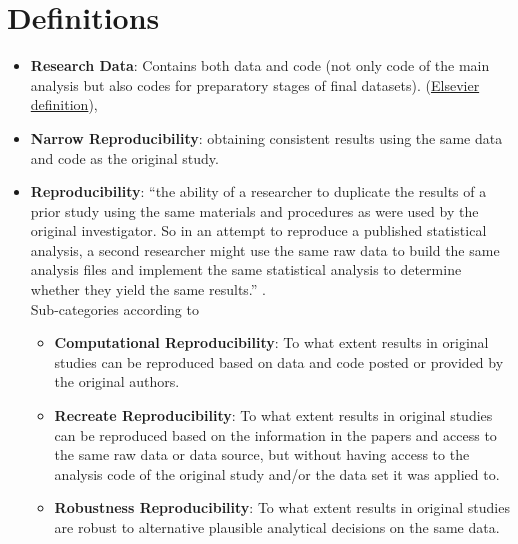 \documentclass[11pt]{article}
\begin{document}
\newpage
\section*{Definitions}
\begin{itemize}
	\item \textbf{Research Data}: Contains both data and code (not only code of the main analysis but also codes for preparatory stages of final datasets).
	(\href{https://www.elsevier.com/authors/tools-and-resources/research-data}{Elsevier definition}),
	\item \textbf{Narrow Reproducibility}: obtaining consistent results using the same data and code
	as the original study. \cite{whited2023Costs}
	
	\item \textbf{Reproducibility}: “the ability of a researcher to duplicate the results of a prior study using
	the same materials and procedures as were used by the original investigator. So in an attempt to
	reproduce a published statistical analysis, a second researcher might use the same raw data to
	build the same analysis files and implement the same statistical analysis to determine whether
	they yield the same results.” \cite{bollen2015social}.\\
	Sub-categories according to \cite{dreber2023framework}
	\begin{itemize}
		\item \textbf{Computational Reproducibility}: To what extent results in original studies can be reproduced based on data and code posted or provided by the original authors. \cite{dreber2023framework}
		\item \textbf{Recreate Reproducibility}: To what extent results in original studies can be reproduced based on the information in the papers and access to the same raw data or data source, but without having access to the analysis code of the original study and/or the data set it was applied to.
		\item \textbf{Robustness Reproducibility}: To what extent results in original studies are robust to 		alternative plausible analytical decisions on the same data.
	\end{itemize}

        


\end{itemize}
\end{document}
